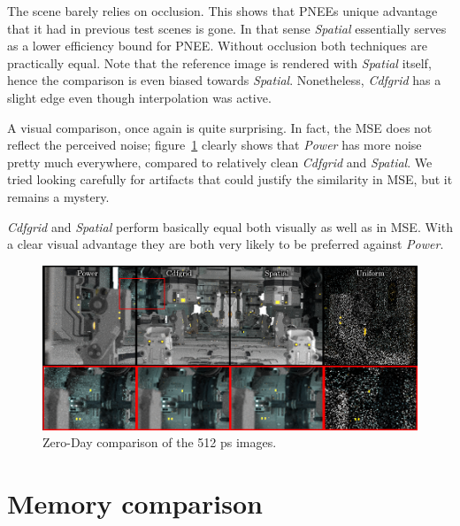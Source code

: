 The scene barely relies on occlusion. This shows that PNEEs unique advantage that it had in previous test scenes is gone. In that sense \textit{Spatial} essentially serves as a lower efficiency bound for PNEE. Without occlusion both techniques are practically equal. Note that the reference image is rendered with \textit{Spatial} itself, hence the comparison is even biased towards \textit{Spatial}. Nonetheless, \textit{Cdfgrid} has a slight edge even though interpolation was active. 

A visual comparison, once again is quite surprising. In fact, the MSE does not reflect the perceived noise; figure~\ref{fig:zdcomp} clearly shows that \textit{Power} has more noise pretty much everywhere, compared to relatively clean \textit{Cdfgrid} and \textit{Spatial}. We tried looking carefully for artifacts that could justify the similarity in MSE, but it remains a mystery.

\textit{Cdfgrid} and \textit{Spatial} perform basically equal both visually as well as in MSE. With a clear visual advantage they are both very likely to be preferred against \textit{Power}.



\begin{figure}
    \centering
    \includegraphics[width=1\textwidth]{figures/comparisons/ZDcomp_slim.png}
    \caption{Zero-Day comparison of the 512 ps images.}
    \label{fig:zdcomp}
\end{figure}


\FloatBarrier
\section{Memory comparison}

